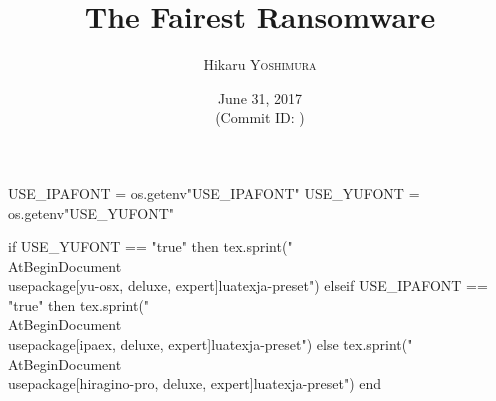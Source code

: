 \hypersetup{colorlinks,linkcolor=,urlcolor=links}

\beamertemplatenavigationsymbolsempty


\usepackage{luacode}
\usepackage{luatexja}
\usepackage{pgfpages}

\begin{luacode*}
  USE_IPAFONT = os.getenv"USE_IPAFONT"
  USE_YUFONT = os.getenv"USE_YUFONT"
  
  if USE_YUFONT == "true" then
    tex.sprint("\\AtBeginDocument{\\usepackage[yu-osx, deluxe, expert]{luatexja-preset}}")
  elseif USE_IPAFONT == "true" then
    tex.sprint("\\AtBeginDocument{\\usepackage[ipaex, deluxe, expert]{luatexja-preset}}")
  else
    tex.sprint("\\AtBeginDocument{\\usepackage[hiragino-pro, deluxe, expert]{luatexja-preset}}")
  end
\end{luacode*}

\usepackage{epigraph}
\usepackage{etoolbox}
\usepackage{tikz}
\usepackage{framed}
\usepackage{libertine}
\usepackage{amsmath}
\usepackage{mathtools}
\usepackage{listings}
\usepackage{tikz-qtree}
\usepackage{cryptocode}

\renewcommand{\kanjifamilydefault}{\gtdefault}


\setmainfont[Ligatures=TeX]{Linux Libertine O}
\setsansfont[Ligatures=TeX]{CMU Sans Serif}
\setmonofont[Ligatures=TeX]{CMU Typewriter Text}



\title{The Fairest Ransomware}
\author[Hikaru YOSHIMURA]{%
  Hikaru \textsc{Yoshimura}
}
\date[June 31, 2017]{%
  June 31, 2017 \\%
  {\footnotesize (Commit ID: \GITAbrHash)}
}







